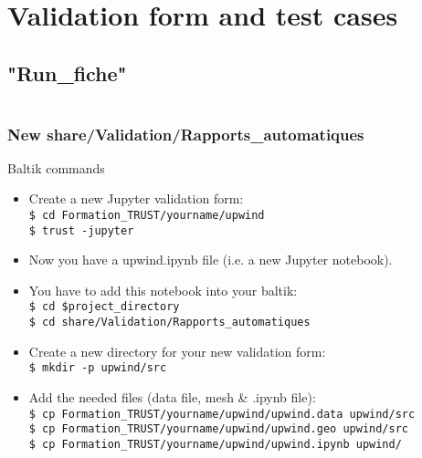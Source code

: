 \documentclass[10pt, hyperref={unicode=true,pdfusetitle, bookmarks=true,bookmarksnumbered=false,bookmarksopen=false, breaklinks=false,pdfborder={0 0 1},backref=true,colorlinks=true,linkcolor=darkblue,pageanchor, urlcolor=darkblue}]{beamer}
\begin{document}
\section{{\bf{Validation form and test cases}}}
\subsection{{\bf{"Run\_fiche"}}}
\begin{frame}
\begin{columns}[c] 
\tableofcontents[sections={1-4},currentsection, currentsubsection]
\tableofcontents[sections={5-10},currentsection, currentsubsection]
\end{columns}
\end{frame}
\begin{frame}
\frametitle{New share/Validation/Rapports\_automatiques}
\begin{block}{Baltik commands}

\begin{itemize}
\item Create a new Jupyter validation form:\\
\texttt{\$ cd Formation\_TRUST/yourname/upwind}\\
\texttt{\$ trust -jupyter}
\item Now you have a upwind.ipynb file (i.e. a new Jupyter notebook).

\item You have to add this notebook into your baltik:\\
\texttt{\$ cd \$project\_directory}\\
\texttt{\$ cd share/Validation/Rapports\_automatiques}

\item Create a new directory for your new validation form:\\
\texttt{\$ mkdir -p upwind/src}

\item Add the needed files (data file, mesh \& .ipynb file):\\
\texttt{\$ cp Formation\_TRUST/yourname/upwind/upwind.data upwind/src}\\
\texttt{\$ cp Formation\_TRUST/yourname/upwind/upwind.geo upwind/src}\\
\texttt{\$ cp Formation\_TRUST/yourname/upwind/upwind.ipynb upwind/}
\end{itemize}

\end{block}
\end{frame}
\end{document}
